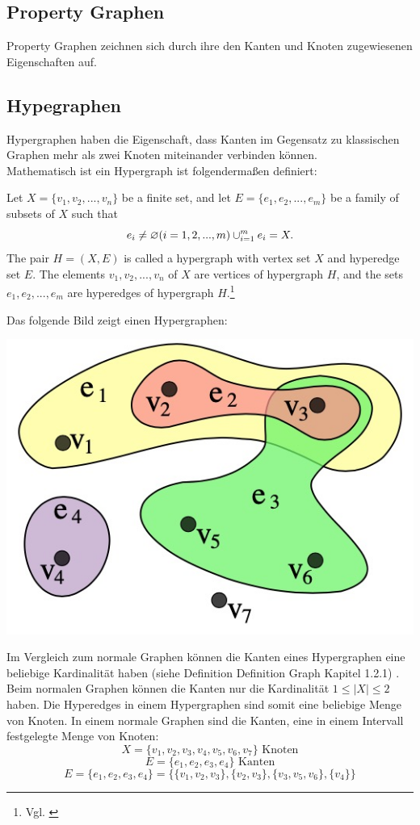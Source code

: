 \subsection{Property Graphen}
Property Graphen zeichnen sich durch ihre den Kanten und Knoten zugewiesenen Eigenschaften auf.
\subsection{Hypegraphen}
Hypergraphen haben die Eigenschaft, dass Kanten im Gegensatz zu klassischen Graphen mehr als zwei Knoten miteinander verbinden können.
\\Mathematisch ist ein Hypergraph ist folgendermaßen definiert:
\begin{definition}
	Let $X=\{v_{1}, v_{2},...,v_{n}\}$ be a finite set,
	and let $E=\{e_{1},e_{2},...,e_{m}\}$ be a family of subsets of $X$ such that
	\[e_{i} \neq \varnothing (i=1,2,...,m) \\
	\cup_{i=1}^{m}e_{i}=X.
	\]
	The pair $H=(X,E)$ is called a hypergraph with vertex set $X$
	and hyperedge set $E$. The elements $v_{1}, v_{2},...,v_{n}$ of $X$ are vertices
	of hypergraph $H$, and the sets $e_{1}, e_{2},...,e_{m}$ are hyperedges of hypergraph $H$.\footnote{Vgl. \cite[Seite 2]{zhang2018hypergraph}}
\end{definition}

Das folgende Bild zeigt einen Hypergraphen:

\begin{center}
	\includegraphics[scale = 0.5]{./images/Hypergraph.jpg}
\end{center}
Im Vergleich zum normale Graphen können die Kanten eines Hypergraphen eine beliebige Kardinalität haben (siehe Definition Definition Graph Kapitel 1.2.1) . Beim normalen Graphen können die Kanten nur die Kardinalität $1 \leq |X| \leq 2$
haben. Die Hyperedges in einem Hypergraphen sind somit eine beliebige Menge von Knoten. In einem normale Graphen sind die Kanten, eine in einem Intervall festgelegte Menge von Knoten:
    \[X = \{v_{1}, v_{2}, v_{3}, v_{4}, v_{5}, v_{6}, v_{7}\} \text{ Knoten}\]
    \[E=\{e_{1}, e_{2}, e_{3}, e_{4}\} \text{ Kanten}\]
    \[E=\{e_{1}, e_{2}, e_{3}, e_{4}\} = \{\{v_{1}, v_{2}, v_{3}\}, \{v_{2}, v_{3}\}, \{v_{3}, v_{5}, v_{6}\}, \{v_{4}\}\} \]